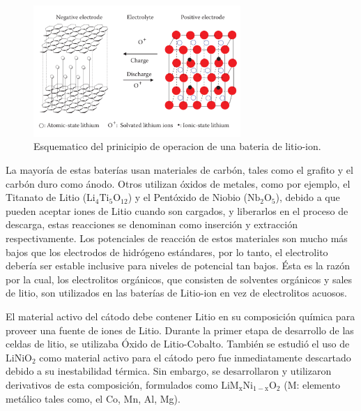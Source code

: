 \documentclass[10pt,a4paper]{article}
\begin{document}
    \begin{figure}[h!]
        \begin{center}
            \includegraphics[width=0.7\textwidth]{prin_litio}
            \caption{Esquematico del prinicipio de operacion de una bateria de
            litio-ion.}
            \label{op_lithium-ion}
        \end{center}
    \end{figure}

    \noindent La mayoría de estas baterías usan materiales de carbón, 
    tales como el grafito y el carbón duro como ánodo. Otros utilizan óxidos de 
    metales, como por ejemplo, el Titanato de Litio ($\mathrm{Li_4Ti_5O_{12}}$) 
    y el Pentóxido de Niobio ($\mathrm{Nb_2O_5}$), debido a que pueden aceptar 
    iones de Litio cuando son cargados, y liberarlos en el proceso de descarga, 
    estas reacciones se denominan como inserción y extracción respectivamente. 
    Los potenciales de reacción de estos materiales son mucho más bajos que los 
    electrodos de hidrógeno estándares, por lo tanto, el electrolito debería ser 
    estable inclusive para niveles de potencial tan bajos. Ésta es la razón por la 
    cual, los electrolitos orgánicos, que consisten de solventes orgánicos y 
    sales de litio, son utilizados en las baterías de Litio-ion en vez de 
    electrolitos acuosos.

	\noindent El material activo del cátodo debe contener Litio en su composición química 
    para proveer una fuente de iones de Litio. Durante la primer etapa de 
    desarrollo de las celdas de litio, se utilizaba Óxido de Litio-Cobalto.
    También se estudió el uso de $\mathrm{LiNiO_2}$ como 
    material activo para el cátodo pero fue inmediatamente descartado debido a 
    su inestabilidad térmica. Sin embargo, se desarrollaron y utilizaron 
    derivativos de esta composición, formulados como 
    $\mathrm{LiM_xNi_{1-x}O_2}$ (M: elemento metálico tales como, el Co, Mn, 
    Al, Mg).
	
\end{document}
